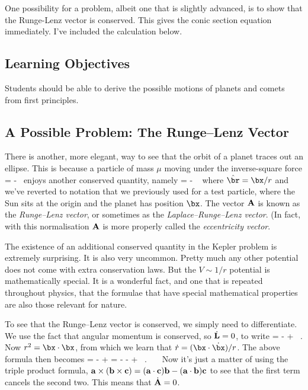 \para
{\cblue One possibility for a problem, albeit one that is slightly advanced, is to show that the Runge-Lenz vector is conserved. This gives the conic section equation immediately. I've included the calculation below. 


\subsection{Learning Objectives}

Students should be able to derive the possible motions of planets and comets from first principles. 


\subsection{A Possible Problem: The Runge--Lenz Vector}

There is another, more elegant, way to see that the orbit of a planet traces out an ellipse. This is because a particle of mass $\mu$ moving under the inverse-square force
%
 = -\hat{\br}\ \ee
%
enjoys another conserved quantity, namely
%
 =  - \hat{\br}\ \label{rungelenz}\ee
%
where $\hat{\br} = \bx/r$ and we've reverted to notation that we previously used for a test particle, where the Sun sits at the origin and the planet has position $\bx$.  The vector ${\bf A}$ is known as the {\it Runge--Lenz vector}, or sometimes as the {\it Laplace--Runge--Lenz vector}. (In fact, with this normalisation ${\bf A}$ is more properly called the {\it eccentricity vector}.

\para
The existence of an additional conserved quantity in the Kepler problem is extremely surprising. It is also very uncommon. Pretty much any other potential does not come with extra conservation laws. But the $V\sim 1/r$ potential is mathematically special. It is a wonderful fact, and one that is repeated throughout physics, that the formulae that have special mathematical properties are also those relevant for nature.

\para
To see that the Runge--Lenz vector is conserved, we simply need to differentiate. We use the fact that angular momentum is conserved, so $\dot{\bf L}=0$, to write
%
\be {} =    - + \bx\ .\ee
%
Now $r^2= \bx\cdot\bx$, from which we learn that $\dot{r} = (\bx\cdot\dot{\bx})/r$. The above formula then becomes
%
\be {} =  -  + \bx =  - -    + \bx\ .\ \ \ \ee
%
Now it's just a matter of using the triple product formula, ${\bf a}\times ({\bf b}\times{\bf c}) = ({\bf a}\cdot {\bf c}){\bf b} - ({\bf a}\cdot {\bf b}){\bf c}$ to see that the first term cancels the second two. This means that $\dot{\bf A}=0$. 

}
